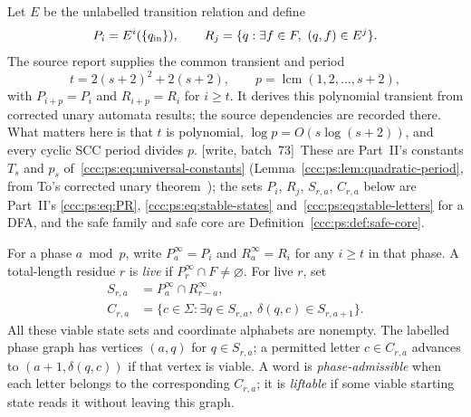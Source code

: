 \documentclass[11pt,letterpaper]{article}
\theoremstyle{definition}
\theoremstyle{remark}
\newcommand{\wsevthree}{\textup{[write, batch~73]}}
\begin{document}
Let $E$ be the unlabelled transition relation and define
\[
P_i=E^i(\{q_{\rm in}\}),\qquad
R_j=\{q:\exists f\in F,\ (q,f)\in E^j\}.
\]
The source report supplies the common transient and period
\begin{equation}\label{ccc:dc:eq:constants}
t=2(s+2)^2+2(s+2),\qquad p=\operatorname{lcm}(1,2,\ldots,s+2),
\end{equation}
with $P_{i+p}=P_i$ and $R_{i+p}=R_i$ for $i\ge t$. It derives this polynomial transient from corrected unary automata results; the source dependencies are recorded there. What matters here is that $t$ is polynomial, $\log p=O(s\log(s+2))$, and every cyclic SCC period divides $p$.
\wsevthree\ These are Part~II's constants $T_s$ and $p_s$
of~\eqref{ccc:ps:eq:universal-constants} (Lemma~\ref{ccc:ps:lem:quadratic-period},
from To's corrected unary theorem~\cite{To}); the sets $P_i$, $R_j$, $S_{r,a}$,
$C_{r,a}$ below are Part~II's \eqref{ccc:ps:eq:PR},
\eqref{ccc:ps:eq:stable-states} and~\eqref{ccc:ps:eq:stable-letters} for a
DFA, and the safe family and safe core are
Definition~\ref{ccc:ps:def:safe-core}.

For a phase $a\bmod p$, write $P^\infty_a=P_i$ and $R^\infty_a=R_i$ for any $i\ge t$ in that phase. A total-length residue $r$ is \emph{live} if $P^\infty_r\cap F\ne\varnothing$. For live $r$, set
\begin{align}
S_{r,a}&=P^\infty_a\cap R^\infty_{r-a},\label{ccc:dc:eq:S}\\
C_{r,a}&=\{c\in\Sigma:\exists q\in S_{r,a},\ \delta(q,c)\in S_{r,a+1}\}.
\label{ccc:dc:eq:C}
\end{align}
All these viable state sets and coordinate alphabets are nonempty. The labelled phase graph has vertices $(a,q)$ for $q\in S_{r,a}$; a permitted letter $c\in C_{r,a}$ advances to $(a+1,\delta(q,c))$ if that vertex is viable. A word is \emph{phase-admissible} when each letter belongs to the corresponding $C_{r,a}$; it is \emph{liftable} if some viable starting state reads it without leaving this graph.
\end{document}
